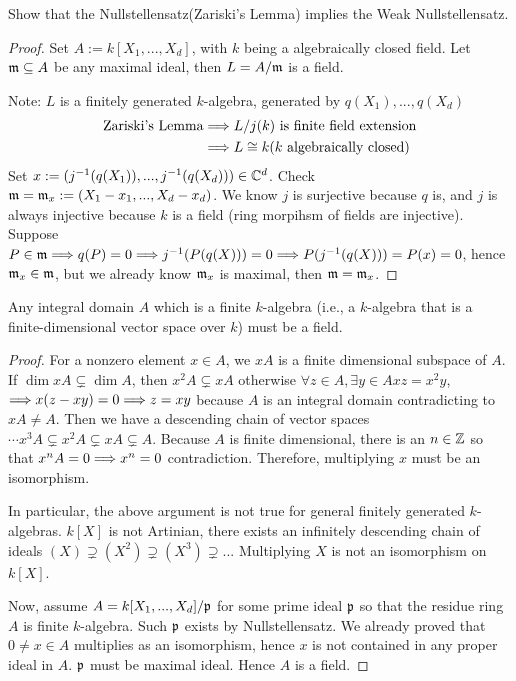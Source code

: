 \begin{exr}
Show that the Nullstellensatz(Zariski's Lemma) implies the Weak Nullstellensatz.
\end{exr}
\begin{proof} Set $A:=k[X_1,...,X_d]$, with $k$ being a algebraically closed field.
Let ${\mathfrak m}\subseteq {A}$ be any maximal ideal, then $ L={A}/{\mathfrak m}$ is a field.
\begin{center}
\end{center}
Note: $ L$ is a finitely generated $k$-algebra, generated by $q(X_1),...,q(X_d)$
$$
\begin{aligned}
\text{Zariski's Lemma}&\Longrightarrow  L/j(k)\text{ is finite field extension}\\
 & \Longrightarrow
 L\cong k \text{($k$ algebraically closed)}
\end{aligned}
$$
Set $x:=(j^{-1}(q(X_1)),...,j^{-1}(q(X_d)))\in \mathbb C^d$. Check ${\mathfrak m}={\mathfrak m}_x:=(X_1-x_1,...,X_d-x_d)$.
We know $j$ is surjective because $q$ is, and $j$ is always injective because $k$ is a field (ring morpihsm of fields are injective). Suppose $P\in {\mathfrak m}\Longrightarrow q(P)=0\Longrightarrow j^{-1}(P(q(X)))=0\Longrightarrow P(j^{-1}(q(X)))=P(x)=0$, hence ${\mathfrak m}_x\in {\mathfrak m}$, but we already know ${\mathfrak m}_x$ is maximal, then ${\mathfrak m}={\mathfrak m}_x$.
\end{proof}

\begin{exr}\label{exr:chap3_fin-dim_k_domain_is_field}
Any integral domain $A$ which is a finite $k$-algebra (i.e., a $k$-algebra that is a finite-dimensional vector space over $k$) must be a field. 
\end{exr}
\begin{proof}
For a nonzero element $x\in A$, we $xA$ is a finite dimensional subspace of $A$. If $\dim xA\subsetneq \dim A$, then $x^2A\subsetneq xA$ otherwise $\forall z\in A, \exists y \in A xz=x^2 y$, $\Longrightarrow x(z-xy)=0\Longrightarrow z=xy$ because $A$ is an integral domain contradicting to $xA\neq A$. Then we have a descending chain of vector spaces $\cdots x^3A\subsetneq x^2 A\subsetneq xA\subsetneq A$. Because $A$ is finite dimensional, there is an $n\in \mathbb Z$ so that $x^nA=0\Longrightarrow x^n=0$ contradiction. Therefore, multiplying $x$ must be an isomorphism.

In particular, the above argument is not true for general finitely generated $k$-algebras. $k[X]$ is not Artinian, there exists an infinitely descending chain of ideals $(X)\supsetneq (X^2)\supsetneq (X^3)\supsetneq ...$ Multiplying $X$ is not an isomorphism on $k[X]$.

Now, assume $A=k[X_1,...,X_d]/{\mathfrak p}$  for some prime ideal ${\mathfrak p}$ so that the residue ring $A$ is finite $k$-algebra. Such ${\mathfrak p}$ exists by Nullstellensatz. We already proved that $0\neq x\in A$ multiplies as an isomorphism, hence $x$ is not contained in any proper ideal in $A$. ${\mathfrak p}$ must be maximal ideal. Hence $A$ is a field.
\end{proof}

